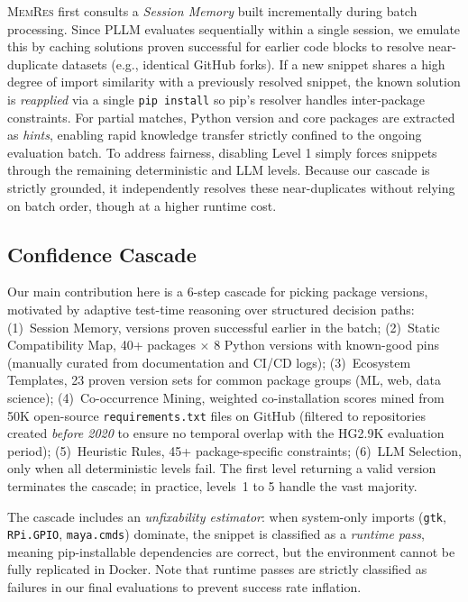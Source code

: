 \documentclass[sigconf,screen]{acmart}
\begin{document}
\textsc{MemRes} first consults a \emph{Session Memory} built incrementally during batch processing.
Since PLLM evaluates sequentially within a single session, we emulate this by caching solutions proven successful for earlier code blocks to resolve near-duplicate datasets (e.g., identical GitHub forks).
If a new snippet shares a high degree of import similarity with a previously resolved snippet, the known solution is \emph{reapplied} via a single \texttt{pip install} so pip's resolver handles inter-package constraints.
For partial matches, Python version and core packages are extracted as \emph{hints}, enabling rapid knowledge transfer strictly confined to the ongoing evaluation batch.
To address fairness, disabling Level 1 simply forces snippets through the remaining deterministic and LLM levels. Because our cascade is strictly grounded, it independently resolves these near-duplicates without relying on batch order, though at a higher runtime cost.

\subsection{Confidence Cascade}
\label{sec:cascade}

Our main contribution here is a 6-step cascade for picking package versions, motivated by adaptive test-time reasoning over structured decision paths:
(1)~Session Memory, versions proven successful earlier in the batch;
(2)~Static Compatibility Map, 40+ packages $\times$ 8 Python versions with known-good pins (manually curated from documentation and CI/CD logs);
(3)~Ecosystem Templates, 23 proven version sets for common package groups (ML, web, data science);
(4)~Co-occurrence Mining, weighted co-installation scores mined from 50K open-source \texttt{requirements.txt} files on GitHub (filtered to repositories created \emph{before 2020} to ensure no temporal overlap with the HG2.9K evaluation period);
(5)~Heuristic Rules, 45+ package-specific constraints;
(6)~LLM Selection, only when all deterministic levels fail.
The first level returning a valid version terminates the cascade; in practice, levels~1 to 5 handle the vast majority.

The cascade includes an \emph{unfixability estimator}: when system-only imports (\texttt{gtk}, \texttt{RPi.GPIO}, \texttt{maya.cmds}) dominate, the snippet is classified as a \emph{runtime pass}, meaning pip-installable dependencies are correct, but the environment cannot be fully replicated in Docker. Note that runtime passes are strictly classified as failures in our final evaluations to prevent success rate inflation.
\end{document}
